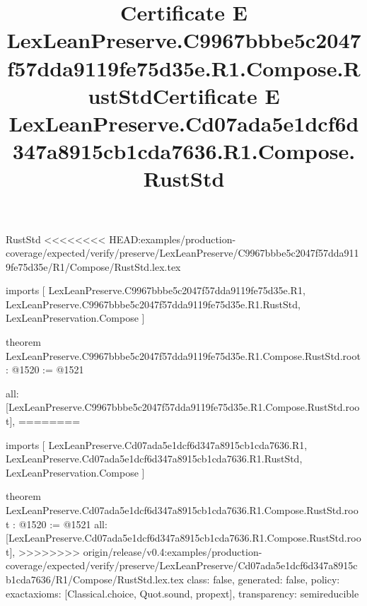 \begin{lexlean}{RustStd}
<<<<<<<< HEAD:examples/production-coverage/expected/verify/preserve/LexLeanPreserve/C9967bbbe5c2047f57dda9119fe75d35e/R1/Compose/RustStd.lex.tex
\title{Certificate E LexLeanPreserve.C9967bbbe5c2047f57dda9119fe75d35e.R1.Compose.RustStd}
\begin{coremodule}
imports [
  LexLeanPreserve.C9967bbbe5c2047f57dda9119fe75d35e.R1,
  LexLeanPreserve.C9967bbbe5c2047f57dda9119fe75d35e.R1.RustStd,
  LexLeanPreservation.Compose
]

theorem LexLeanPreserve.C9967bbbe5c2047f57dda9119fe75d35e.R1.Compose.RustStd.root : @1520 := @1521 {
  all: [LexLeanPreserve.C9967bbbe5c2047f57dda9119fe75d35e.R1.Compose.RustStd.root],
========
\title{Certificate E LexLeanPreserve.Cd07ada5e1dcf6d347a8915cb1cda7636.R1.Compose.RustStd}
\begin{coremodule}
imports [
  LexLeanPreserve.Cd07ada5e1dcf6d347a8915cb1cda7636.R1,
  LexLeanPreserve.Cd07ada5e1dcf6d347a8915cb1cda7636.R1.RustStd,
  LexLeanPreservation.Compose
]

theorem LexLeanPreserve.Cd07ada5e1dcf6d347a8915cb1cda7636.R1.Compose.RustStd.root : @1520 := @1521 {
  all: [LexLeanPreserve.Cd07ada5e1dcf6d347a8915cb1cda7636.R1.Compose.RustStd.root],
>>>>>>>> origin/release/v0.4:examples/production-coverage/expected/verify/preserve/LexLeanPreserve/Cd07ada5e1dcf6d347a8915cb1cda7636/R1/Compose/RustStd.lex.tex
  class: false,
  generated: false,
  policy: exact{axioms: [Classical.choice, Quot.sound, propext]},
  transparency: semireducible
}


\end{coremodule}}
\end{coremodule}
\end{lexlean}
